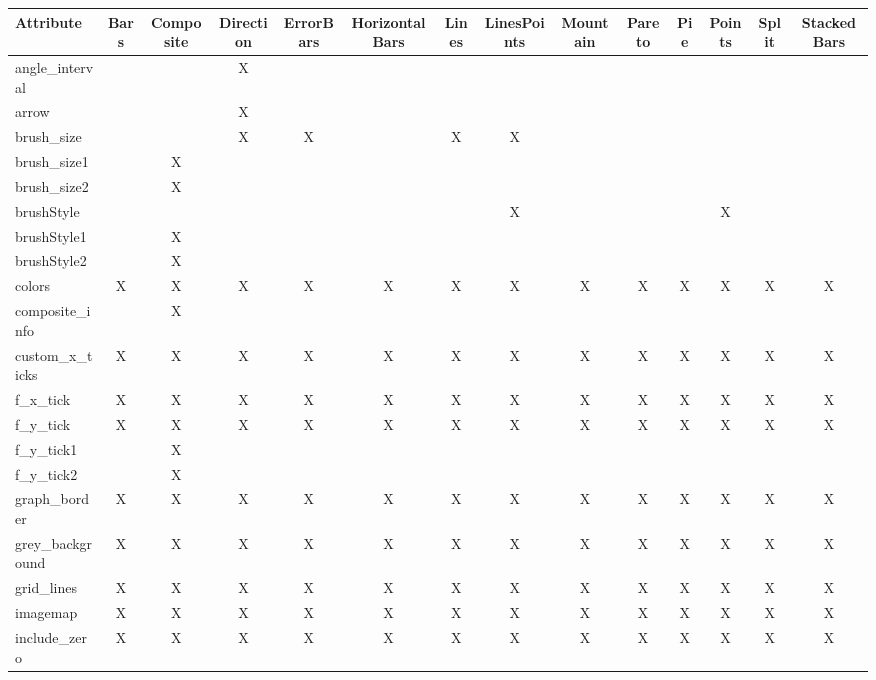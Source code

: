 {
\begin{table}
\tiny
\begin{tabular}{|l|c|c|c|c|c|c|c|c|c|c|c|c|c|}
\hline
Attribute & Bars & Composite& Direction& ErrorBars& HorizontalBars& Lines& LinesPoints& Mountain& Pareto& Pie& Points& Split& StackedBars \\
\hline
angle\_interval        &   &   & X &   &   &   &   &   &   &   &   &   &   \\
arrow                  &   &   & X &   &   &   &   &   &   &   &   &   &   \\
brush\_size            &   &   & X & X &   & X & X &   &   &   &   &   &   \\
brush\_size1           &   & X &   &   &   &   &   &   &   &   &   &   &   \\
brush\_size2           &   & X &   &   &   &   &   &   &   &   &   &   &   \\
brushStyle             &   &   &   &   &   &   & X &   &   &   & X &   &   \\
brushStyle1            &   & X &   &   &   &   &   &   &   &   &   &   &   \\
brushStyle2            &   & X &   &   &   &   &   &   &   &   &   &   &   \\
colors                 & X & X & X & X & X & X & X & X & X & X & X & X & X \\
composite\_info        &   & X &   &   &   &   &   &   &   &   &   &   &   \\
custom\_x\_ticks       & X & X & X & X & X & X & X & X & X & X & X & X & X \\
f\_x\_tick             & X & X & X & X & X & X & X & X & X & X & X & X & X \\
f\_y\_tick             & X & X & X & X & X & X & X & X & X & X & X & X & X \\
f\_y\_tick1            &   & X &   &   &   &   &   &   &   &   &   &   &   \\
f\_y\_tick2            &   & X &   &   &   &   &   &   &   &   &   &   &   \\
graph\_border          & X & X & X & X & X & X & X & X & X & X & X & X & X \\
grey\_background       & X & X & X & X & X & X & X & X & X & X & X & X & X \\
grid\_lines            & X & X & X & X & X & X & X & X & X & X & X & X & X \\
imagemap               & X & X & X & X & X & X & X & X & X & X & X & X & X \\
include\_zero          & X & X & X & X & X & X & X & X & X & X & X & X & X \\

\end{tabular}
\end{table}}
